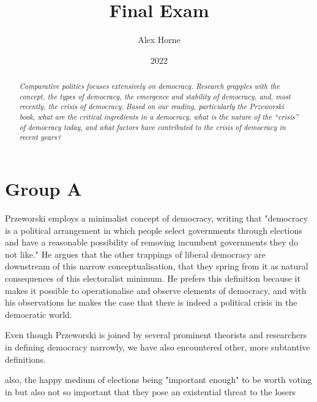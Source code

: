 \documentclass[12pt]{article}
\title{Final Exam}
\author{Alex Horne}
\date{2022}
\begin{document}
\maketitle

\section*{Group A}

\renewcommand{\abstractname}{Question 1}
\begin{abstract}
    \textit{
        Comparative politics focuses extensively on democracy. Research grapples with the concept, the types of democracy, the emergence and stability of democracy, and, most recently, the crisis of democracy. Based on our reading, particularly the Przeworski book, what are the critical ingredients in a democracy, what is the nature of the “crisis” of democracy today, and what factors have contributed to the crisis of democracy in recent years?
    }
\end{abstract}

Przeworski employs a minimalist concept of democracy, writing that "democracy is a political arrangement in which people select governments through elections and have a reasonable possibility of removing incumbent governments they do not like." \autocite[5]{przeworski2019crises} He argues that the other trappings of liberal democracy are downstream of this narrow conceptualisation, that they spring from it as natural consequences of this electoralist minimum. He prefers this definition because it makes it possible to operationalise and observe elements of democracy, and with his observations he makes the case that there is indeed a political crisis in the democratic world.

Even though Przeworski is joined by several prominent theorists and researchers in defining democracy narrowly, we have also encountered other, more subtantive definitions.

also, the happy medium of elections being "important enough" to be worth voting in but also not so important that they pose an existential threat to the losers
\end{document}
